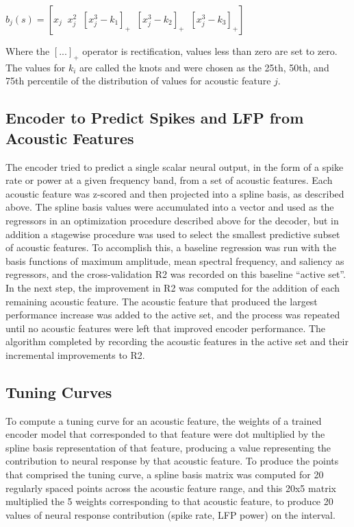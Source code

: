 \begin{center}
$b_j (s) = [x_j \;\; x_j^2 \;\; [x_j^3 - k_1]_+ \;\; [x_j^3 - k_2]_+ \;\; [x_j^3 - k_3]_+ ]$
\end{center}

Where the $[...]_+$ operator is rectification, values less than zero are set to zero. The values for $k_i$ are called the knots and were chosen as the 25th, 50th, and 75th percentile of the distribution of values for acoustic feature $j$.


\subsection{Encoder to Predict Spikes and LFP from Acoustic Features}

The encoder tried to predict a single scalar neural output, in the form of a spike rate or power at a given frequency band, from a set of acoustic features. Each acoustic feature was z-scored and then projected into a spline basis, as described above. The spline basis values were accumulated into a vector and used as the regressors in an optimization procedure described above for the decoder, but in addition a stagewise procedure was used to select the smallest predictive subset of acoustic features. To accomplish this, a baseline regression was run with the basis functions of maximum amplitude, mean spectral frequency, and saliency as regressors, and the cross-validation R2 was recorded on this baseline ``active set''. In the next step, the improvement in R2 was computed for the addition of each remaining acoustic feature. The acoustic feature that produced the largest performance increase was added to the active set, and the process was repeated until no acoustic features were left that improved encoder performance. The algorithm completed by recording the acoustic features in the active set and their incremental improvements to R2.


\subsection{Tuning Curves}

To compute a tuning curve for an acoustic feature, the weights of a trained encoder model that corresponded to that feature were dot multiplied by the spline basis representation of that feature, producing a value representing the contribution to neural response by that acoustic feature. To produce the points that comprised the tuning curve, a spline basis matrix was computed for 20 regularly spaced points across the acoustic feature range, and this 20x5 matrix multiplied the 5 weights corresponding to that acoustic feature, to produce 20 values of neural response contribution (spike rate, LFP power) on the interval.


